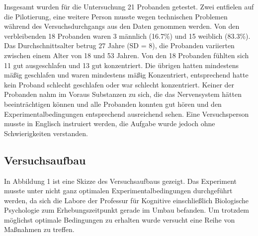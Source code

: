\documentclass[doc,a4paper,12pt]{apa6}
\begin{document}
Insgesamt wurden für die Untersuchung 21 Probanden getestet. Zwei entfielen auf die Pilotierung, eine weitere Person musste wegen technischen Problemen während des Versuchsdurchgangs aus den Daten genommen werden. Von den verbleibenden 18 Probanden waren 3 männlich (16.7\%) und 15 weiblich (83.3\%). Das Durchschnittsalter betrug 27 Jahre (SD = 8), die Probanden variierten zwischen einem Alter von 18 und 53 Jahren. Von den 18 Probanden fühlten sich 11 gut ausgeschlafen und 13 gut konzentriert. Die übrigen hatten mindestens mäßig geschlafen und waren mindestens mäßig Konzentriert, entsprechend hatte kein Proband schlecht geschlafen oder war schlecht konzentriert. Keiner der Probanden nahm im Voraus Substanzen zu sich, die das Nervensystem hätten beeinträchtigen können und alle Probanden konnten gut hören und den Experimentalbedingungen entsprechend ausreichend sehen. Eine Versuchsperson musste in Englisch instruiert werden, die Aufgabe wurde jedoch ohne Schwierigkeiten verstanden.

\subsection{Versuchsaufbau}

In Abbildung 1 ist eine Skizze des Versuchsaufbaus gezeigt. Das Experiment musste unter nicht ganz optimalen Experimentalbedingungen durchgeführt werden, da sich die Labore der Professur für Kognitive einschließlich Biologische Psychologie zum Erhebungszeitpunkt gerade im Umbau befanden. Um trotzdem möglichst optimale Bedingungen zu erhalten wurde versucht eine Reihe von Maßnahmen zu treffen.

\newpage
\end{document}

